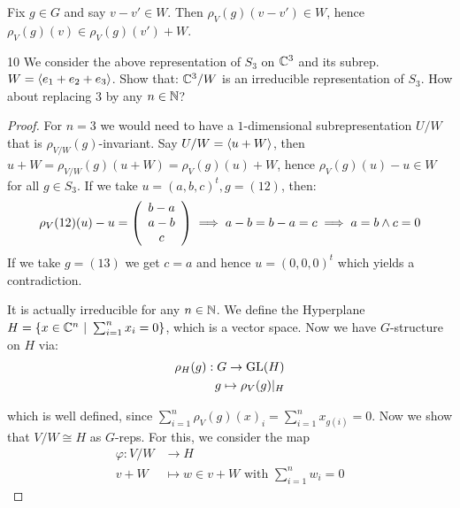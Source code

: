 \documentclass[twoside = false,	%
		headsepline,		%
		parskip = true,
		]{scrbook}						%
\begin{document}
    Fix $g \in G$ and say $v - v' \in W$. Then $\rho_V(g)(v-v') \in W$, hence $\rho_V(g)(v) \in \rho_V(g)(v') + W$.
    
    \begin{exercise}{}{10}
        We consider the above representation of $S_3$ on $\mathbb C^3$ and its subrep. $W = \left\langle e_1 + e_2 + e_3\right\rangle$. Show that: $\mathbb C^3/W$ is an irreducible representation of $S_3$. How about replacing $3$ by any $n \in \mathbb N$?
    \end{exercise}

    \begin{proof}
        For $n=3$ we would need to have a $1$-dimensional subrepresentation $U/W$ that is $\rho_{V/W}(g)$-invariant. Say $U/W = \left\langle u + W\right\rangle$, then $u + W = \rho_{V/W}(g)(u+W) = \rho_{V}(g)(u) + W$, hence $\rho_V(g)(u) - u \in W$ for all $g \in S_3$. If we take $u = (a,b,c)^t, g = (12)$, then:
        \begin{equation*}
            \rho_V(12)(u) - u = \left( \begin{array}{c}
                 b-a  \\
                 a-b \\
                 c
            \end{array}\right) \implies a-b = b-a = c \implies a = b \land c = 0
        \end{equation*}
        If we take $g = (13)$ we get $c = a$ and hence $u = (0,0,0)^t$ which yields a contradiction.
        
        It is actually irreducible for any $n \in \mathbb N$. We define the Hyperplane $H = \{x \in \mathbb C^n \ | \ \sum_{i=1}^n x_i = 0\}$, which is a vector space. Now we have $G$-structure on $H$ via:
        \begin{equation*}
        \begin{split}
            \rho_H(g): G \to \mathrm{GL}(H) \\
                        g \mapsto \rho_V(g)|_H
        \end{split}
        \end{equation*}
        
        which is well defined, since $\sum_{i=1}^n\rho_V(g)(x)_i = \sum_{i=1}^n x_{g(i)} = 0$. Now we show that $V/W \cong H$ as $G$-reps. For this, we consider the map
        \begin{equation*}
        \begin{split}
            \varphi: V/W &\to H \\
                    v + W &\mapsto w \in v + W \text{ with } \sum_{i=1}^n w_i = 0
        \end{split}
        \end{equation*}
        

\end{proof}
\end{document}
